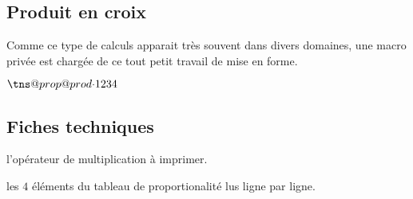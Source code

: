 \documentclass[12pt,a4paper]{article}
\begin{document}

\subsection{Produit en croix}

Comme ce type de calculs apparait très souvent dans divers domaines, une macro privée est chargée de ce tout petit travail de mise en forme.

\begin{latexex}
\makeatletter
$\tns@prop@prod{\cdot} %
               {1}{2}  %
               {3}{4}$ %
\makeatother
\end{latexex}




\subsection{Fiches techniques}



 l'opérateur de multiplication à imprimer.

 les $4$ éléments du tableau de proportionalité lus ligne par ligne.
\end{document}
